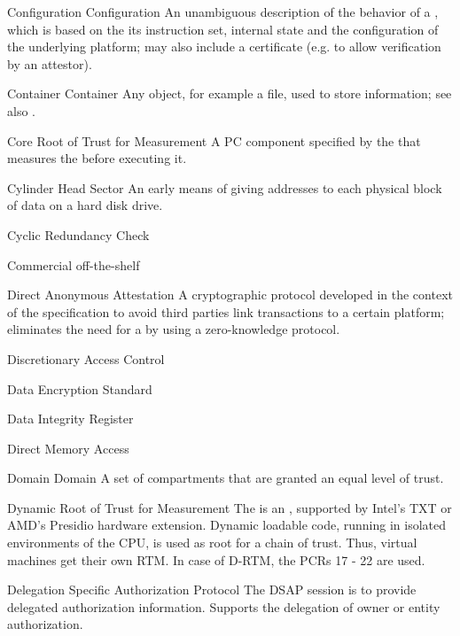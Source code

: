 \glosentry
    {Configuration}
    {Configuration}
    {An unambiguous description of the behavior of a \Compartment, which is
based on the its instruction set, internal state and the configuration of the
underlying platform; may also include a certificate (e.g. to allow verification
by an attestor).}

\glosentry
    {Container}
    {Container}
    {Any object, for example a file, used to store information; see also
\SecureContainer.}

    {Core Root of Trust for Measurement}
    {A PC component specified by the \TCG that measures the \BIOS before
executing it.}

    {Cylinder Head Sector}	
    {An early means of giving addresses to each physical block of data on a
hard disk drive.}

    {Cyclic Redundancy Check}

    {Commercial off-the-shelf}

    {Direct Anonymous Attestation}
    {A cryptographic protocol developed in the context of the \TCG specification
\cite{BrCaCh2004} to avoid third parties link
transactions to a certain platform; eliminates the need for a \PrivacyCA by
using a zero-knowledge protocol.}

    {Discretionary Access Control}

    {Data Encryption Standard}

    {Data Integrity Register}	
    {}

    {Direct Memory Access}

\glosentry
    {Domain}
    {Domain}
    {A set of compartments that are granted an equal level of trust.}

    {Dynamic Root of Trust for Measurement }
    {The \drtm is an \RTM, supported by Intel's TXT or AMD's Presidio hardware extension. Dynamic loadable code, running in isolated environments of the CPU, is used as root for a chain of trust. Thus, virtual machines get their own RTM. In case of D-RTM, the PCRs 17 - 22 are used.}



    {Delegation Specific Authorization Protocol}
    {The DSAP session is to provide delegated authorization information. Supports the delegation of owner or entity authorization.}

